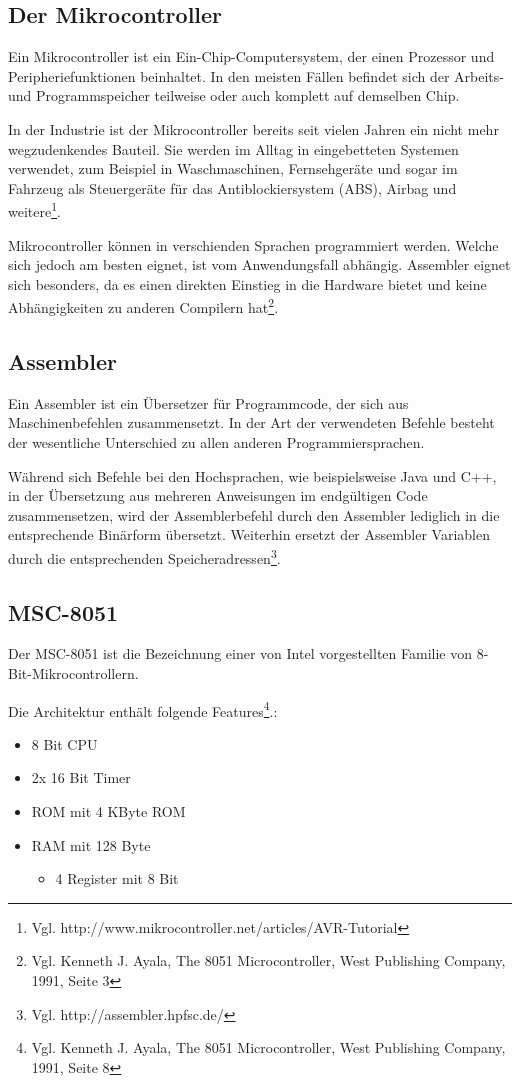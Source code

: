 \subsection{Der Mikrocontroller}
	Ein Mikrocontroller ist ein Ein-Chip-Computersystem, der einen Prozessor und Peripheriefunktionen beinhaltet. In den meisten Fällen befindet sich der Arbeits- und Programmspeicher teilweise oder auch komplett auf demselben Chip. 
	
	In der Industrie ist der Mikrocontroller bereits seit vielen Jahren ein nicht mehr wegzudenkendes Bauteil. Sie werden im Alltag in eingebetteten Systemen verwendet, zum Beispiel in Waschmaschinen, Fernsehgeräte und sogar im Fahrzeug als Steuergeräte für das Antiblockiersystem (ABS), Airbag und weitere\footnote{Vgl. http://www.mikrocontroller.net/articles/AVR-Tutorial}.
	
	Mikrocontroller können in verschienden Sprachen programmiert werden. Welche sich jedoch am besten eignet, ist vom Anwendungsfall abhängig. Assembler eignet sich besonders, da es einen direkten Einstieg in die Hardware bietet und keine Abhängigkeiten zu anderen Compilern hat\footnote{Vgl. Kenneth J. Ayala, The 8051 Microcontroller, West Publishing Company, 1991, Seite 3}. 
	
\subsection{Assembler}
	Ein Assembler ist ein Übersetzer für Programmcode, der sich aus Maschinenbefehlen zusammensetzt. In der Art der verwendeten Befehle besteht der wesentliche Unterschied zu allen anderen Programmiersprachen. 
	
	Während sich Befehle bei den Hochsprachen, wie beispielsweise Java und C++, in der Übersetzung aus mehreren Anweisungen im endgültigen Code zusammensetzen, wird der Assemblerbefehl durch den Assembler lediglich in die entsprechende Binärform übersetzt. Weiterhin ersetzt der Assembler Variablen durch die entsprechenden Speicheradressen\footnote{Vgl. http://assembler.hpfsc.de/}.
	
\subsection{MSC-8051}
	Der MSC-8051 ist die Bezeichnung einer von Intel vorgestellten Familie von 8-Bit-Mikrocontrollern.
	
	Die Architektur enthält folgende Features\footnote{Vgl. Kenneth J. Ayala, The 8051 Microcontroller, West Publishing Company, 1991, Seite 8}.:
	\begin{itemize}
		\item{ 8 Bit CPU }
		\item{ 2x 16 Bit Timer }
		\item{ ROM mit 4 KByte ROM }
		\item{ RAM mit 128 Byte 
			\begin{itemize}
				\item { 4 Register mit 8 Bit } 
			\end{itemize}
		}
	\end{itemize}
	
